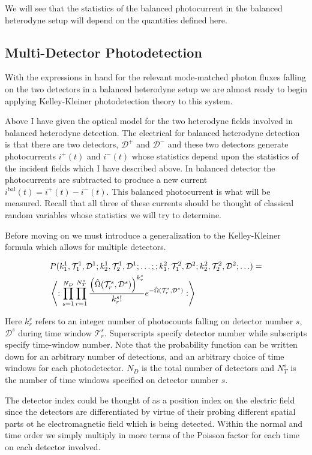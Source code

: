 \documentclass[12pt]{article}
\newcommand{\mc}[1]{\mathcal{#1}}
\begin{document}
We will see that the statistics of the balanced photocurrent in the balanced heterodyne setup will depend on the quantities defined here.

\subsection{Multi-Detector Photodetection}

With the expressions in hand for the relevant mode-matched photon fluxes falling on the two detectors in a balanced heterodyne setup we are almost ready to begin applying Kelley-Kleiner photodetection theory to this system.

Above I have given the optical model for the two heterodyne fields involved in balanced heterodyne detection. The electrical for balanced heterodyne detection is that there are two detectors, $\mc{D}^+$ and $\mc{D}^-$ and these two detectors generate photocurrents $i^+(t)$ and $i^-(t)$ whose statistics depend upon the statistics of the incident fields which I have described above. In balanced detector the photocurrents are subtracted to produce a new current $i^{\text{bal}}(t) = i^+(t) - i^-(t)$. This balanced photocurrent is what will be measured. Recall that all three of these currents should be thought of classical random variables whose statistics we will try to determine.

Before moving on we must introduce a generalization to the Kelley-Kleiner formula which allows for multiple detectors.

\begin{align}
&P(k_1^1, \mc{T}_1^1, \mc{D}^1; k_2^1, \mc{T}_2^1, \mc{D}^1; \ldots;; k_1^2, \mc{T}_1^2, \mc{D}^2; k_2^2, \mc{T}_2^2, \mc{D}^2; \ldots ) =\\
&\Braket{:\prod_{s=1}^{N_D} \prod_{r=1}^{N_T^s} \frac{\left(\hat{\Omega}(\mc{T}_r^s, \mc{D}^s)\right)^{k_r^s}}{k_r^s!} e^{-\hat{\Omega}(\mc{T}_r^s, \mc{D}^s)} :}
\end{align}

Here $k_r^s$ refers to an integer number of photocounts falling on detector number $s$, $\mc{D}^s$ during time window $\mc{T}_r^s$. Superscripts specify detector number while subscripts specify time-window number. Note that the probability function can be written down for an arbitrary number of detections, and an arbitrary choice of time windows for each photodetector. $N_D$ is the total number of detectors and $N_T^s$ is the number of time windows specified on detector number $s$.

The detector index could be thought of as a position index on the electric field since the detectors are differentiated by virtue of their probing different spatial parts ot he electromagnetic field which is being detected. Within the normal and time order we simply multiply in more terms of the Poisson factor for each time on each detector involved.
\end{document}
